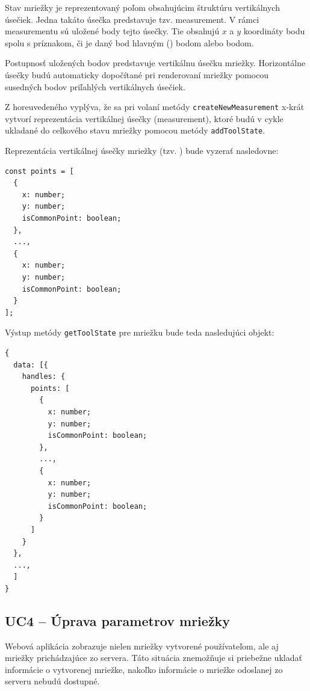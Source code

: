 Stav mriežky je reprezentovaný poľom obsahujúcim štruktúru vertikálnych úsečiek. Jedna takáto úsečka predstavuje tzv. measurement. V rámci measurementu sú uložené body tejto úsečky. Tie obsahujú $x$ a $y$ koordináty bodu spolu s príznakom, či je daný bod hlavným () bodom alebo\newline {} bodom.

Postupnosť uložených bodov predstavuje vertikálnu úsečku mriežky. Horizontálne úsečky budú automaticky dopočítané pri renderovaní mriežky pomocou susedných bodov priľahlých vertikálnych úsečiek.

Z horeuvedeného vyplýva, že sa pri volaní metódy \texttt{createNewMeasurement} x-krát vytvorí reprezentácia vertikálnej úsečky (measurement), ktoré budú v cykle ukladané do celkového stavu mriežky pomocou metódy \texttt{addToolState}.

Reprezentácia vertikálnej úsečky mriežky (tzv. ) bude vyzerať nasledovne:

\begin{minipage}[]{\linewidth}
\begin{verbatim}
const points = [
  {
    x: number;
    y: number;
    isCommonPoint: boolean;
  },
  ...,
  {
    x: number;
    y: number;
    isCommonPoint: boolean;
  }
];
\end{verbatim}
\end{minipage}

Výstup metódy \texttt{getToolState} pre mriežku bude teda nasledujúci objekt:

\begin{minipage}[]{\linewidth}
\begin{verbatim}
{
  data: [{
    handles: {
      points: [
        {
          x: number;
          y: number;
          isCommonPoint: boolean;
        },
        ...,
        {
          x: number;
          y: number;
          isCommonPoint: boolean;
        }
      ]
    }
  },
  ...,
  ]
}
\end{verbatim}
\end{minipage}

\subsection {UC4 -- Úprava parametrov mriežky}
Webová aplikácia zobrazuje nielen mriežky vytvorené používateľom, ale aj mriežky prichádzajúce zo servera. Táto situácia znemožňuje si priebežne ukladať informácie o vytvorenej mriežke, nakoľko informácie o mriežke odoslanej zo serveru nebudú dostupné.


